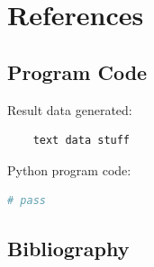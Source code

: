 \documentclass{mcmthesis}
\begin{document}
    \section{References}

    \subsection{Program Code}
    \noindent Result data generated:
    \begin{verbatim}
    text data stuff

    \end{verbatim}

    \noindent Python program code:
    \begin{lstlisting}[language=Python]
        # pass

    \end{lstlisting}


    \subsection{Bibliography}
\end{document}
